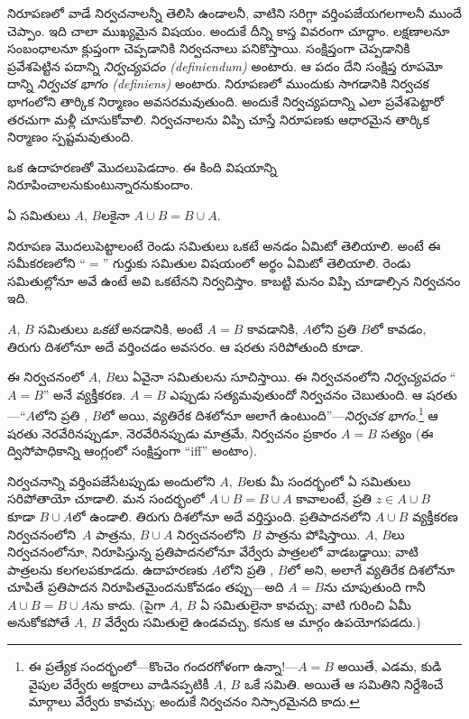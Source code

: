 \documentclass[../../../include/open-logic-section]{subfiles}
\begin{document}


నిరూపణలో వాడే నిర్వచనాలన్నీ తెలిసి ఉండాలనీ, వాటిని
సరిగ్గా వర్తింపజేయగలగాలనీ ముందే చెప్పాం. ఇది చాలా ముఖ్యమైన
విషయం. అందుకే దీన్ని కాస్త వివరంగా చూద్దాం. లక్షణాలనూ
సంబంధాలనూ క్లుప్తంగా చెప్పడానికి నిర్వచనాలు పనికొస్తాయి.
సంక్షిప్తంగా చెప్పడానికి ప్రవేశపెట్టిన పదాన్ని \emph{నిర్వచ్యపదం (definiendum)} అంటారు. ఆ పదం దేని సంక్షిప్త రూపమో దాన్ని
\emph{నిర్వచక భాగం (definiens)} అంటారు. నిరూపణలో ముందుకు
సాగడానికి నిర్వచక భాగంలోని తార్కిక నిర్మాణం అవసరమవుతుంది.
అందుకే నిర్వచ్యపదాన్ని ఎలా ప్రవేశపెట్టారో తరచుగా మళ్లీ
చూసుకోవాలి. నిర్వచనాలను విప్పి చూస్తే నిరూపణకు ఆధారమైన
తార్కిక నిర్మాణం స్పష్టమవుతుంది.

ఒక ఉదాహరణతో మొదలుపెడదాం. ఈ కింది విషయాన్ని నిరూపించాలనుకుంటున్నారనుకుందాం.

\begin{prop}
ఏ సమితులు $A$, $B$లకైనా $A \cup B = B \cup A$.
\end{prop}

నిరూపణ మొదలుపెట్టాలంటే రెండు సమితులు ఒకటే అనడం ఏమిటో
తెలియాలి. అంటే ఈ సమీకరణలోని ``$=$'' గుర్తుకు సమితుల విషయంలో
అర్థం ఏమిటో తెలియాలి. రెండు సమితుల్లోనూ అవే
 ఉంటే అవి ఒకటేనని నిర్వచిస్తాం.
కాబట్టి మనం విప్పి చూడాల్సిన నిర్వచనం ఇది.

\begin{defn}
$A$, $B$ సమితులు \emph{ఒకటే} అనడానికి, అంటే $A = B$ కావడానికి, $A$లోని ప్రతి  $B$లో  కావడం, తిరుగు దిశలోనూ అదే వర్తించడం అవసరం. ఆ షరతు సరిపోతుంది కూడా.
\end{defn}

ఈ నిర్వచనంలో $A$, $B$లు ఏవైనా సమితులను సూచిస్తాయి. ఈ నిర్వచనంలోని \emph{నిర్వచ్యపదం} ``$A = B$'' అనే వ్యక్తీకరణ. $A = B$ ఎప్పుడు సత్యమవుతుందో నిర్వచనం చెబుతుంది. ఆ షరతు---``$A$లోని ప్రతి , $B$లో  అయి, వ్యతిరేక దిశలోనూ అలాగే ఉంటుంది''---\emph{నిర్వచక భాగం}.\footnote{ఈ ప్రత్యేక సందర్భంలో---కొంచెం గందరగోళంగా ఉన్నా!---$A = B$ అయితే, ఎడమ, కుడి వైపుల వేర్వేరు అక్షరాలు వాడినప్పటికీ $A$, $B$ ఒకే సమితి. అయితే ఆ సమితిని నిర్దేశించే మార్గాలు వేర్వేరు కావచ్చు; అందుకే నిర్వచనం నిస్సారమైనది కాదు.} ఆ షరతు నెరవేరినప్పుడూ, నెరవేరినప్పుడు మాత్రమే, నిర్వచనం ప్రకారం $A = B$ సత్యం (ఈ ద్విసోపాధికాన్ని ఆంగ్లంలో సంక్షిప్తంగా ``iff'' అంటాం).

నిర్వచనాన్ని వర్తింపజేసేటప్పుడు అందులోని $A$, $B$లకు
మీ సందర్భంలో ఏ సమితులు సరిపోతాయో చూడాలి. మన సందర్భంలో
$A \cup B = B \cup A$ కావాలంటే, ప్రతి $z \in A \cup
B$ కూడా $B \cup A$లో ఉండాలి. తిరుగు దిశలోనూ అదే వర్తిస్తుంది. ప్రతిపాదనలోని $A \cup
B$ వ్యక్తీకరణ నిర్వచనంలోని~$A$ పాత్రను, $B
\cup A$ నిర్వచనంలోని~$B$ పాత్రను పోషిస్తాయి. $A$, $B$లు నిర్వచనంలోనూ, నిరూపిస్తున్న ప్రతిపాదనలోనూ వేర్వేరు పాత్రలలో వాడబడ్డాయి; వాటి పాత్రలను కలగలపకూడదు. ఉదాహరణకు $A$లోని ప్రతి , $B$లో  అని, అలాగే వ్యతిరేక దిశలోనూ చూపితే ప్రతిపాదన నిరూపితమైందనుకోవడం తప్పు---అది $A = B$ను చూపుతుంది గానీ $A \cup B = B \cup A$ను కాదు. (పైగా $A$, $B$ ఏ సమితులైనా కావచ్చు; వాటి గురించి ఏమీ అనుకోకపోతే $A$, $B$ వేర్వేరు సమితులై ఉండవచ్చు, కనుక ఆ మార్గం ఉపయోగపడదు.)
\end{document}
